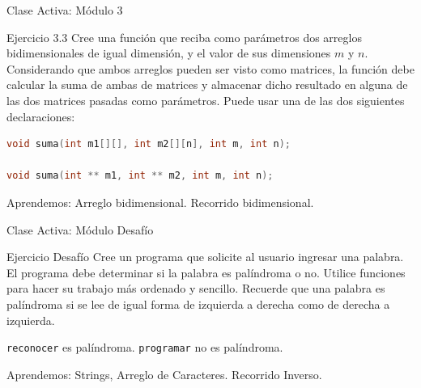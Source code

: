 \documentclass{beamer}
\begin{document}
\begin{frame}[fragile]{Clase Activa: Módulo 3}
\begin{exampleblock}{Ejercicio 3.3}
Cree una función que reciba como parámetros dos arreglos bidimensionales de igual dimensión, y el valor de sus dimensiones $m$ y $n$. Considerando que ambos arreglos pueden ser visto como matrices, la función debe calcular la suma de ambas de matrices y almacenar dicho resultado en alguna de las dos matrices pasadas como parámetros. Puede usar una de las dos siguientes declaraciones:
\begin{lstlisting}[language=C, basicstyle=\scriptsize]
void suma(int m1[][], int m2[][n], int m, int n);

void suma(int ** m1, int ** m2, int m, int n);
\end{lstlisting}
\end{exampleblock}

{\tiny Aprendemos: Arreglo bidimensional. Recorrido bidimensional.}
\end{frame}


\begin{frame}[fragile]{Clase Activa: Módulo Desafío}
\begin{exampleblock}{Ejercicio Desafío}
Cree un programa que solicite al usuario ingresar una palabra. El programa debe determinar si la palabra es palíndroma o no. Utilice funciones para hacer su trabajo más ordenado y sencillo. Recuerde que una palabra es palíndroma si se lee de igual forma de izquierda a derecha como de derecha a izquierda.
\bigskip

\texttt{reconocer} es palíndroma. \texttt{programar} no es palíndroma.

\end{exampleblock}
{\tiny Aprendemos: Strings, Arreglo de Caracteres. Recorrido Inverso.}
\end{frame}
\end{document}
